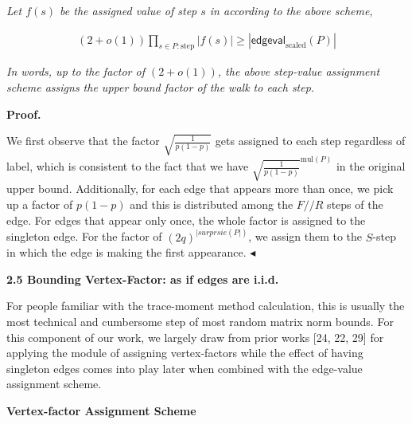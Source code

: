 \emph{Let $f(s)$ be the assigned value of step $s$ in according to the above scheme,}\par


\[\begin{gathered}
(2+o(1))\prod_{s\in P:\text{step}}|f(s)|\geq|\mathsf{edgeval}_{\text{scaled}}(P)|
\end{gathered}\]


\emph{In words, up to the factor of $(2+o(1))$, the above step-value assignment scheme assigns the upper bound factor of the walk to each step.}\par






\par\medskip\noindent\textbf{Proof.}\par




We first observe that the factor $\sqrt{\frac{1}{p(1-p)}}$ gets assigned to each step regardless of label, which is consistent to the fact that we have $\sqrt{\frac{1}{p(1-p)}}^{\text{mul}(P)}$ in the original upper bound. Additionally, for each edge that appears more than once, we pick up a factor of $p(1-p)$ and this is distributed among the $F//R$ steps of the edge. For edges that appear only once, the whole factor is assigned to the singleton edge. For the factor of $(2q)^{|surprsie(P|)}$, we assign them to the $S$-step in which the edge is making the first appearance. $\blacktriangleleft$\par






\par\medskip\noindent\textbf{
2.5 Bounding Vertex-Factor: as if edges are i.i.d.}\par




For people familiar with the trace-moment method calculation, this is usually the most technical and cumbersome step of most random matrix norm bounds. For this component of our work, we largely draw from prior works [24, 22, 29] for applying the module of assigning vertex-factors while the effect of having singleton edges comes into play later when combined with the edge-value assignment scheme.\par




\par\medskip\noindent\textbf{Vertex-factor Assignment Scheme}\par




